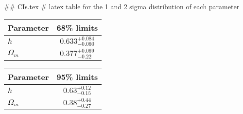 ## CIs.tex
# latex table for the 1 and 2 sigma distribution of each parameter

\begin{tabular} { l  c}
 Parameter &  68\% limits\\
\hline
{\boldmath$h              $} & $0.633^{+0.084}_{-0.060}   $\\
{\boldmath$\Omega_m       $} & $0.377^{+0.069}_{-0.22}    $\\
\hline
\end{tabular}

\begin{tabular} { l  c}
 Parameter &  95\% limits\\
\hline
{\boldmath$h              $} & $0.63^{+0.12}_{-0.15}      $\\
{\boldmath$\Omega_m       $} & $0.38^{+0.44}_{-0.27}      $\\
\hline
\end{tabular}
